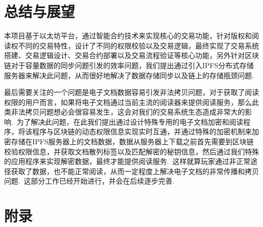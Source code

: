 \documentclass[a4paper,12pt,titlepage]{ctexart}
\begin{document}
\section{总结与展望}
本项目基于以太坊平台，通过智能合约技术来实现核心的交易功能，针对版权和阅读权不同的交易特性，设计了不同的权限校验以及交易逻辑，最终实现了交易系统搭建、交易逻辑设计、交易合约部署以及交易流程验证等核心功能，另外针对区块链对于容量数据的同步问题引发的效率问题，我们提出通过引入IPFS分布式存储服务器来解决此问题，从而很好地解决了数据存储同步以及链上的存储瓶颈问题.~\par
最后需要关注的一个问题是电子文档数据容易引发非法拷贝问题，对于获取了阅读权限的用户而言，如果将电子文档通过当前主流的阅读器来提供阅读服务，那么此类非法拷贝问题想必会很容易发生，这会对我们的交易系统生态造成非常大的影响.~为了解决此问题，在此我们提出通过设计特殊专用的电子文档加密和阅读程序，将该程序与区块链的动态权限信息实现实时互通，并通过特殊的加密机制来加密存储在IPFS服务器上的文档数据，数据从服务器上下载之前首先需要到区块链校验权限信息，并获取文档散列标签以及匹配解密的秘钥信息，然后通过我们特殊的应用程序来实现解密数据，最终才能提供阅读服务.~这样就算玩家通过非正常途径获取了数据，也不能正常阅读，从而一定程度上解决电子文档的非常传播和拷贝问题.~这部分工作已经开始进行，并会在后续逐步完善.~

\newpage
{}
\section{附录}
\end{document}
